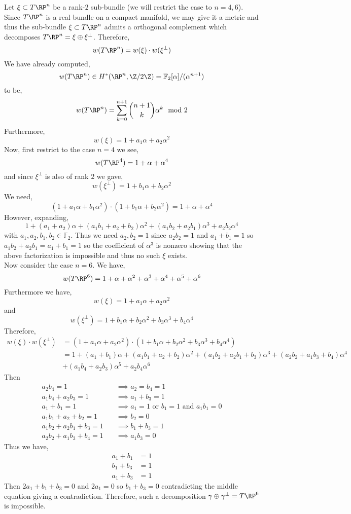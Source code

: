 \documentclass[12pt]{extarticle}
\newcommand{\F}{\mathbb{F}}
\begin{document}
Let $\xi \subset T \RP^n$ be a rank-$2$ sub-bundle (we will restrict the case to $n = 4,6$). Since $T \RP^n$ is a real bundle on a compact manifold, we may give it a metric and thus the sub-bundle $\xi \subset T \RP^n$ admits a orthogonal complement which decomposes $T \RP^n = \xi \oplus \xi^\perp$. Therefore,
\[ w(T \RP^n) = w(\xi) \cdot w(\xi^\perp) \]
We have already computed,
\[ w(T \RP^n) \in H^*(\RP^n, \Z/2\Z) = \F_2[\alpha]/(\alpha^{n+1}) \]
to be,
\[ w(T \RP^n) = \sum_{k = 0}^{n+1} { n + 1 \choose k } \alpha^k \mod 2 \]
Furthermore, 
\[ w(\xi) = 1 + a_1 \alpha + a_2 \alpha^2 \]
Now, first restrict to the case $n = 4$ we see,
\[ w(T \RP^4) = 1 + \alpha + \alpha^4 \]
and since $\xi^\perp$ is also of rank $2$ we gave,
\[ w(\xi^\perp) = 1 + b_1 \alpha + b_2 \alpha^2 \]
We need,
\[ (1 + a_1 \alpha + b_1 \alpha^2) \cdot (1 + b_1 \alpha + b_2 \alpha^2) = 1 + \alpha + \alpha^4 \]
However, expanding,
\[ 1 + (a_1 + a_2) \alpha + (a_1 b_1 + a_2 + b_2) \alpha^2 + (a_1 b_2 + a_2 b_1) \alpha^3 + a_2 b_2 \alpha^4 \]
with $a_1, a_2, b_1, b_2 \in \F_2$. Thus we need $a_2, b_2 = 1$ since $a_2 b_2 = 1$ and $a_1 + b_1 = 1$ so $a_1 b_2 + a_2 b_1 = a_1 + b_1 = 1$ so the coefficient of $\alpha^3$ is nonzero showing that the above factorization is impossible and thus no such $\xi$ exists.
\bigskip\\
Now consider the case $n = 6$. We have,
\[ w(T \RP^6) = 1 + \alpha + \alpha^2 + \alpha^3 + \alpha^4 + \alpha^5 + \alpha^6 \]
Furthermore we have,
\[ w(\xi) = 1 + a_1 \alpha + a_2 \alpha^2 \]
and
\[ w(\xi^\perp) = 1 + b_1 \alpha + b_2 \alpha^2 + b_3 \alpha^3 + b_4 \alpha^4 \]
Therefore,
\begin{align*}
w(\xi) \cdot w(\xi^\perp) & = (1 + a_1 \alpha + a_2 \alpha^2) \cdot (1 + b_1 \alpha + b_2 \alpha^2 + b_3 \alpha^3 + b_4 \alpha^4) 
\\
& = 1 + (a_1 + b_1) \alpha + (a_1 b_1 + a_2 + b_2) \alpha^2 + (a_1 b_2 + a_2 b_1 + b_3) \alpha^3 + (a_2 b_2 + a_1 b_3 + b_4) \alpha^4
\\
& + (a_1 b_4 + a_2 b_3) \alpha^5 + a_2 b_4 \alpha^6 
\end{align*}
Then 
\begin{align*}
a_2 b_4 = 1 \quad & \implies a_2 = b_4 = 1
\\
a_1 b_4 + a_2 b_3 = 1 \quad & \implies a_1 + b_3 = 1
\\
a_1 + b_1 = 1 \quad & \implies a_1 = 1 \text{ or } b_1 = 1 \text{ and } a_1 b_1 = 0
\\
a_1 b_1 + a_2 + b_2 = 1 \quad & \implies b_2 = 0
\\
a_1 b_2 + a_2 b_1 + b_3 = 1 \quad & \implies b_1 + b_3 = 1
\\
a_2 b_2 + a_1 b_3 + b_4 = 1 \quad & \implies a_1 b_3  = 0
\end{align*}
Thus we have,
\begin{align*}
a_1 + b_1 & = 1
\\
b_1 + b_3 & = 1
\\
a_1 + b_3 & = 1
\end{align*}
Then $2 a_1 + b_1 + b_3 = 0$ and $2 a_1 = 0$ so $b_1 + b_3 = 0$ contradicting the middle equation giving a contradiction. Therefore, such a decomposition $\gamma \oplus \gamma^\perp = T \RP^6$ is impossible. 
\end{document}
